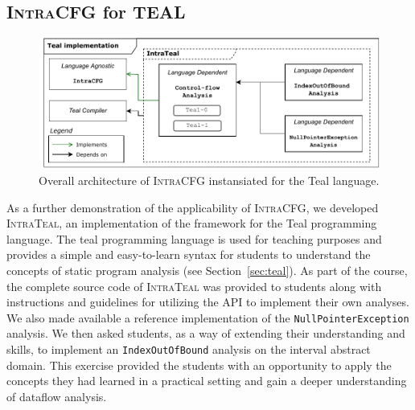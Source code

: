 \subsection{\textsc{IntraCFG} for TEAL}
\begin{figure}[H]
    \centering
    \includegraphics[scale=0.65]{kappa/img/architectureteal.pdf}
    \caption{\label{fig:IntraTeal} Overall architecture of \textsc{IntraCFG} instansiated for the Teal language.}
\end{figure}
As a further demonstration of the applicability of \textsc{IntraCFG},
we developed \textsc{IntraTeal}, an implementation of the framework for the Teal programming language.
The teal programming language is used for teaching purposes
and provides a simple and easy-to-learn syntax for students to understand the
concepts of static program analysis (see Section~\ref{sec:teal}).
As part of the course, the complete source code of \textsc{IntraTeal} was provided to students along with
instructions and guidelines for utilizing the API to implement their own analyses.
We also made available a reference implementation of the
\texttt{NullPointerException} analysis. We then asked students, as a way of
extending their understanding and skills, to implement an \texttt{IndexOutOfBound}
analysis on the interval abstract domain. This exercise provided the
students with an opportunity to apply the concepts they had learned in a practical
setting and gain a deeper understanding of dataflow analysis.

